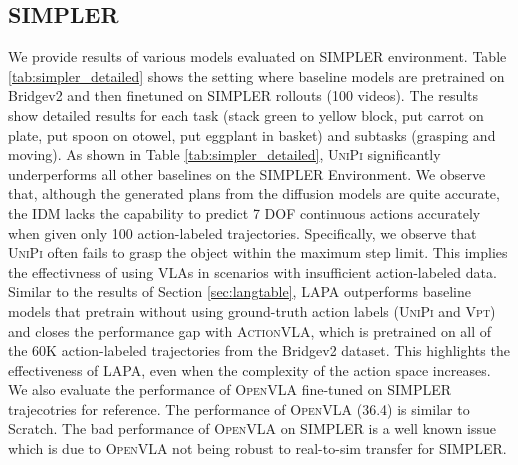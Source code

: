 \documentclass{article} %
\begin{document}
\begin{table}[h!]
\centering
\caption{\textbf{Language Table Cross-Environment Unseen Results.} }
\label{tab:langtable_unseen_cross_env}
\end{table}


\subsection{SIMPLER} 
We provide results of various models evaluated on SIMPLER environment. Table \ref{tab:simpler_detailed} shows the setting where baseline models are pretrained on Bridgev2 and then finetuned on SIMPLER rollouts (100 videos). The results show detailed results for each task (stack green to yellow block, put carrot on plate, put spoon on otowel, put eggplant in basket) and subtasks (grasping and moving). As shown in Table \ref{tab:simpler_detailed}, \textsc{UniPi} significantly underperforms all other baselines on the SIMPLER Environment. We observe that, although the generated plans from the diffusion models are quite accurate, the IDM lacks the capability to predict 7 DOF continuous actions accurately when given only 100 action-labeled trajectories. Specifically, we observe that \textsc{UniPi} often fails to grasp the object within the maximum step limit. This implies the effectivness of using VLAs in scenarios with insufficient action-labeled data. Similar to the results of Section \ref{sec:langtable}, LAPA outperforms baseline models that pretrain without using ground-truth action labels (\textsc{UniPi} and \textsc{Vpt}) and closes the performance gap with \textsc{ActionVLA}, which is pretrained on all of the 60K action-labeled trajectories from the Bridgev2 dataset. This highlights the effectiveness of LAPA, even when the complexity of the action space increases. {We also evaluate the performance of \textsc{OpenVLA} fine-tuned on SIMPLER trajecotries for reference. The performance of \textsc{OpenVLA} (36.4) is similar to Scratch. The bad performance of \textsc{OpenVLA} on SIMPLER is a well known issue which is due to \textsc{OpenVLA} not being robust to real-to-sim transfer for SIMPLER.}
\end{document}
